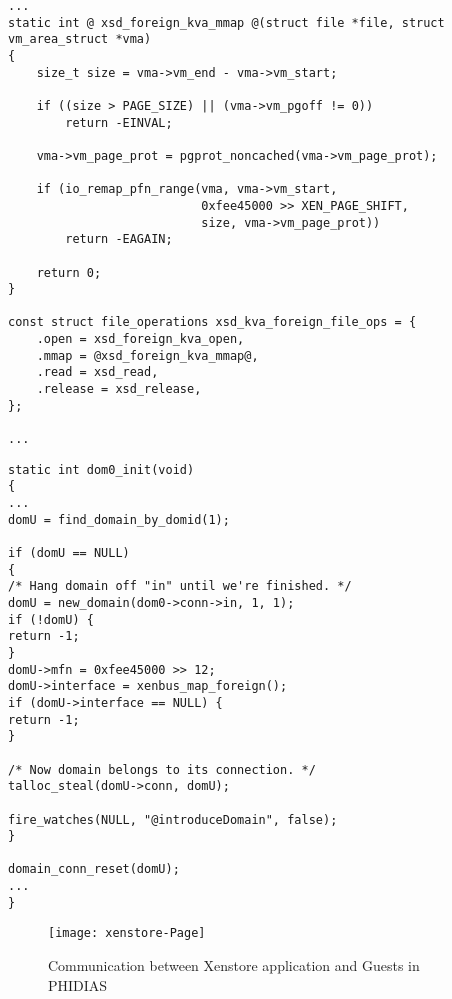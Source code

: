 \begin{lstlisting}[caption=Added file interface for mapping DomU xenstore interface page into userspace in drivers/xen/xenfs/xenstored.c file, label={xvd_foreign},frame=single,style=base]
...
static int @ xsd_foreign_kva_mmap @(struct file *file, struct vm_area_struct *vma)
{
    size_t size = vma->vm_end - vma->vm_start;

    if ((size > PAGE_SIZE) || (vma->vm_pgoff != 0))
        return -EINVAL;
        
    vma->vm_page_prot = pgprot_noncached(vma->vm_page_prot);

    if (io_remap_pfn_range(vma, vma->vm_start,
                           0xfee45000 >> XEN_PAGE_SHIFT,
                           size, vma->vm_page_prot))
        return -EAGAIN; 

    return 0;
}

const struct file_operations xsd_kva_foreign_file_ops = {
    .open = xsd_foreign_kva_open,
    .mmap = @xsd_foreign_kva_mmap@,
    .read = xsd_read,
    .release = xsd_release,
};

...
\end{lstlisting}

\begin{lstlisting}[caption= Manual introduction of DomU in Xenstore during dom0 initialization ,label={xenstorelist}]
static int dom0_init(void) 
{
...
domU = find_domain_by_domid(1);

if (domU == NULL) 
{
/* Hang domain off "in" until we're finished. */
domU = new_domain(dom0->conn->in, 1, 1);
if (!domU) {
return -1;
}
domU->mfn = 0xfee45000 >> 12;
domU->interface = xenbus_map_foreign();
if (domU->interface == NULL) {
return -1;
}

/* Now domain belongs to its connection. */
talloc_steal(domU->conn, domU);

fire_watches(NULL, "@introduceDomain", false);
} 

domain_conn_reset(domU); 
... 
}
\end{lstlisting}

\begin{figure}[!htbp]
	\centering
	\texttt{[image: xenstore-Page]}
	\caption{Communication between Xenstore application and Guests in PHIDIAS}
	\label{xenstore-Page}
\end{figure}

